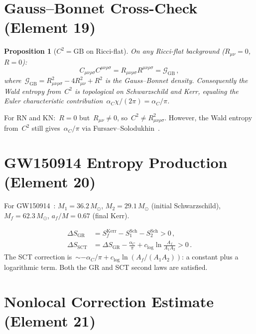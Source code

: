 \documentclass[11pt,a4paper]{article}
\newtheorem{proposition}[theorem]{Proposition}
\newcommand{\Msun}{M_\odot}
\newcommand{\alpC}{\alpha_C}
\newcommand{\clog}{c_{\log}}
\begin{document}
\section{Gauss--Bonnet Cross-Check (Element 19)}\label{sec:GB}

\begin{proposition}[$C^2 = \mathrm{GB}$ on Ricci-flat]\label{prop:GB}
On any Ricci-flat background ($R_{\mu\nu} = 0$, $R = 0$):
\[
  C_{\mu\nu\rho\sigma}C^{\mu\nu\rho\sigma}
  = R_{\mu\nu\rho\sigma}R^{\mu\nu\rho\sigma}
  = \mathcal{G}_{\mathrm{GB}}\,,
\]
where~$\mathcal{G}_{\mathrm{GB}} = R_{\mu\nu\rho\sigma}^2
- 4R_{\mu\nu}^2 + R^2$ is the Gauss--Bonnet density.
Consequently the Wald entropy from~$C^2$ is topological on
Schwarzschild and Kerr, equaling the Euler characteristic
contribution~$\alpC\chi/(2\pi) = \alpC/\pi$.
\end{proposition}

For RN and KN:~$R = 0$ but~$R_{\mu\nu} \neq 0$, so~$C^2 \neq R_{\mu\nu\rho\sigma}^2$.
However, the Wald entropy from~$C^2$ still gives~$\alpC/\pi$ via
Fursaev--Solodukhin~\cite{FS1995}.

\section{GW150914 Entropy Production (Element 20)}\label{sec:GW150914}

For GW150914~\cite{LIGO2016}: $M_1 = 36.2\,\Msun$, $M_2 = 29.1\,\Msun$
(initial Schwarzschild), $M_f = 62.3\,\Msun$, $a_f/M = 0.67$ (final Kerr).

\begin{align}
  \Delta S_{\mathrm{GR}} &= S_f^{\mathrm{Kerr}} - S_1^{\mathrm{Sch}} - S_2^{\mathrm{Sch}} > 0\,, \\
  \Delta S_{\mathrm{SCT}} &= \Delta S_{\mathrm{GR}}
    - \frac{\alpC}{\pi} + \clog\ln\frac{A_f}{A_1 A_2} > 0\,.
\end{align}
The SCT correction is~$\sim -\alpC/\pi + \clog\ln(A_f/(A_1 A_2))$:
a constant plus a logarithmic term.  Both the GR and SCT second
laws are satisfied.

\section{Nonlocal Correction Estimate (Element 21)}\label{sec:nonlocal}
\end{document}
